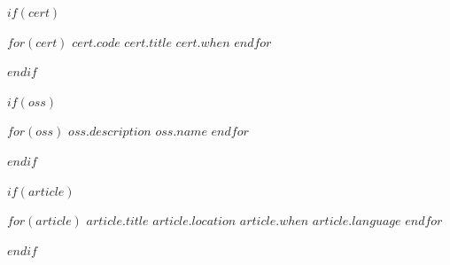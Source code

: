 \documentclass[$fontSize$, $format$]{awesome-cv}
\begin{document}
$if(cert)$
\begin{cventries}
$for(cert)$
    \cventry
        {$cert.code$}
        {$cert.title$}
        {\large\faAws}
        {}
        {$cert.when$}
$endfor$
\end{cventries}
$endif$

$if(oss)$
\begin{cventries}
    $for(oss)$
    \cventry
        {$oss.description$}
        {\href{$oss.url$}{$oss.name$}}
        {\large\faGithub}
        {}
        {}
    $endfor$
\end{cventries}
$endif$

$if(article)$
\begin{cventries}
    $for(article)$
    \cventry
        {$article.title$}
        {$article.location$}
        {$article.when$}
        {$article.language$}
        {}
    $endfor$
\end{cventries}
$endif$
\end{document}
